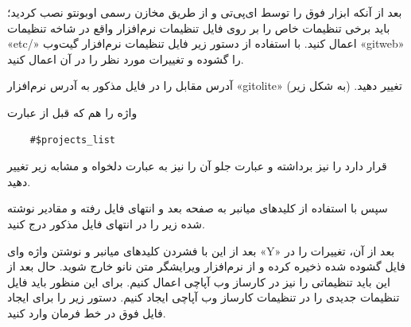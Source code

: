 بعد از آنکه ابزار فوق را توسط ای‌پی‌تی و از طریق مخازن رسمی اوبونتو نصب کردید؛ باید برخی تنظیمات خاص را بر روی فایل تنظیمات نرم‌افزار واقع در شاخه تنظیمات «etc/» اعمال کنید. با استفاده از دستور زیر فایل تنظیمات نرم‌افزار گیت‌وب  «gitweb» را گشوده و تغییرات مورد نظر  را در آن اعمال کنید.
\newline

\begin{latin}  
    
\end{latin}

آدرس مقابل 
را در فایل مذکور به آدرس نرم‌افزار «gitolite» تغییر دهید. (به شکل زیر)
\newline

\begin{latin}  

\end{latin}

واژه 
 را هم که قبل از عبارت
\begin{latin}
    \begin{lstlisting}
    #$projects_list
    \end{lstlisting}
\end{latin}
 قرار دارد را نیز برداشته و عبارت جلو آن را نیز به عبارت دلخواه و مشابه زیر تغییر دهید.
\newline

\begin{latin}  
    
\end{latin}
سپس با استفاده از کلید‌های میانبر 
 به صفحه بعد و انتهای فایل رفته و مقادیر نوشته شده زیر را در انتهای فایل مذکور درج کنید.
\newline

\begin{latin}  
    
\end{latin}
بعد از این با فشردن کلید‌های میانبر 
 و نوشتن واژه وای «Y» بعد از آن، تغییرات را در فایل گشوده شده ذخیره کرده و از نرم‌افزار ویرایشگر متن نانو خارج شوید. حال بعد از این باید تنظیماتی را نیز در کارساز وب آپاچی اعمال کنیم. برای این منظور باید فایل تنظیمات جدیدی را در تنظیمات کارساز وب آپاچی ایجاد کنیم. دستور زیر را برای ایجاد فایل فوق در خط فرمان وارد کنید.
\newline

